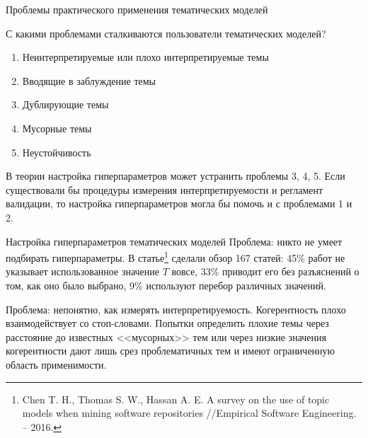 \begin{frame}[t]{Проблемы практического применения тематических моделей}

С какими проблемами сталкиваются пользователи тематических моделей?
\begin{enumerate}
    \item Неинтерпретируемые или плохо интерпретируемые темы
    \item Вводящие в заблуждение темы
    \item Дублирующие темы
    \item Мусорные темы
    \item Неустойчивость
\end{enumerate}
В теории настройка гиперпараметров может устранить проблемы 3, 4, 5. Если существовали бы процедуры измерения интерпретируемости и регламент валидации, то настройка гиперпараметров могла бы помочь и с проблемами 1 и 2.
\end{frame}

\begin{frame}{Настройка гиперпараметров тематических моделей}
Проблема: никто не умеет подбирать гиперпараметры. В статье\footnote{Chen T. H., Thomas S. W., Hassan A. E. A survey on the use of topic models when mining software repositories //Empirical Software Engineering. – 2016.} сделали обзор 167 статей: 45\% работ не указывает использованное значение $T$ вовсе, 33\% приводит его без разъяснений о том, как оно было выбрано, 9\% используют перебор различных значений.

\bigskip

Проблема: непонятно, как измерять интерпретируемость. Когерентность плохо взаимодействует со стоп-словами. Попытки определить плохие темы через расстояние до известных <<мусорных>> тем или через низкие значения когерентности дают лишь срез проблематичных тем и имеют ограниченную область применимости.

\end{frame}


